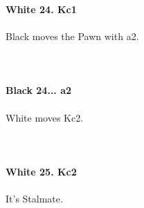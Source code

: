 \documentclass{article}
\begin{document}
\\

\\
\\
\textbf{White 24. Kc1}\\
\\
Black moves the Pawn with a2.\\
\\

\\
\\
\textbf{Black 24... a2}\\
\\
White moves Kc2.\\
\\

\\
\\
\textbf{White 25. Kc2}\\
\\
It's Stalmate.
\end{document}
